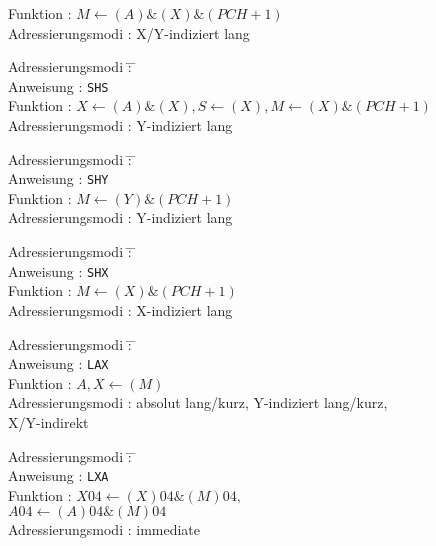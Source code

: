 \documentclass[12pt,a4paper,twoside]{report}
\newcommand{\tty}[1]{{\tt #1}}
\begin{document}
{\begin{tabbing}
Funktion          \> : \> $M\leftarrow(A)\&(X)\&(PCH+1)$ \\
Adressierungsmodi \> : \> X/Y-indiziert lang \\
\end{tabbing}
\begin{tabbing}
Adressierungsmodi \= : \= \kill \\
Anweisung         \> : \> \tty{SHS} \\
Funktion          \> : \> $X\leftarrow(A)\&(X), S\leftarrow(X), M\leftarrow(X)\&(PCH+1)$ \\
Adressierungsmodi \> : \> Y-indiziert lang \\
\end{tabbing}
\begin{tabbing}
Adressierungsmodi \= : \= \kill \\
Anweisung         \> : \> \tty{SHY} \\
Funktion          \> : \> $M\leftarrow(Y)\&(PCH+1)$ \\
Adressierungsmodi \> : \> Y-indiziert lang \\
\end{tabbing}
\begin{tabbing}
Adressierungsmodi \= : \= \kill \\
Anweisung         \> : \> \tty{SHX} \\
Funktion          \> : \> $M\leftarrow(X)\&(PCH+1)$ \\
Adressierungsmodi \> : \> X-indiziert lang \\
\end{tabbing}
\begin{tabbing}
Adressierungsmodi \= : \= \kill \\
Anweisung         \> : \> \tty{LAX} \\
Funktion          \> : \> $A,X\leftarrow(M)$ \\
Adressierungsmodi \> : \> absolut lang/kurz, Y-indiziert lang/kurz, \\
                  \>   \> X/Y-indirekt \\
\end{tabbing}
\begin{tabbing}
Adressierungsmodi \= : \= \kill \\
Anweisung         \> : \> \tty{LXA} \\
Funktion          \> : \> $X{04}\leftarrow(X){04} \& (M){04},$ \\
                  \>   \> $A{04}\leftarrow(A){04} \& (M){04}$ \\
Adressierungsmodi \> : \> immediate \\

\end{tabbing}}
\end{document}
